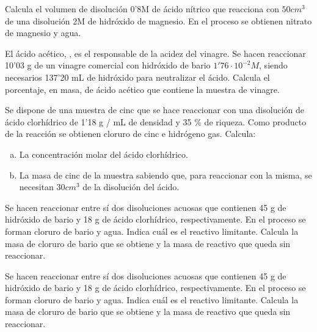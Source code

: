 \begin{prob}
Calcula el volumen de disolución 0'8M de ácido nítrico que reacciona con $50cm^3$ de una
disolución 2M de hidróxido de magnesio. En el proceso se obtienen nitrato de magnesio y
agua.
\end{prob}

\begin{prob}
El ácido acético, , es el responsable de la acidez del vinagre. Se hacen
reaccionar 10'03 g de un vinagre comercial con hidróxido de bario $1'76 \cdot 10^{-2}M$,
siendo necesarios 137'20 mL de hidróxido para neutralizar el ácido. Calcula el porcentaje,
en masa, de ácido acético que contiene la muestra de vinagre.
\end{prob}

\begin{prob}
Se dispone de una muestra de cinc que se hace reaccionar con una disolución de ácido
clorhídrico de 1'18 g / mL de densidad y 35 \% de riqueza. Como producto de la reacción se
obtienen cloruro de cinc e hidrógeno gas. Calcula:
\begin{enumerate}[a)]
	\item La concentración molar del ácido clorhídrico.
	\item La masa de cinc de la muestra sabiendo que, para reaccionar con la misma, se
	necesitan $30cm^3$ de la disolución del ácido.
\end{enumerate}
\end{prob}

\begin{prob}
Se hacen reaccionar entre sí dos disoluciones acuosas que contienen 45 g de hidróxido de
bario y 18 g de ácido clorhídrico, respectivamente. En el proceso se forman cloruro de
bario y agua. Indica cuál es el reactivo limitante. Calcula la masa de cloruro de bario 
que se obtiene y la masa de reactivo que queda sin reaccionar.
\end{prob}

\begin{prob}
Se hacen reaccionar entre sí dos disoluciones acuosas que contienen 45 g de hidróxido de
bario y 18 g de ácido clorhídrico, respectivamente. En el proceso se forman cloruro de
bario y agua. Indica cuál es el reactivo limitante. Calcula la masa de cloruro de bario 
que se obtiene y la masa de reactivo que queda sin reaccionar.
\end{prob}
